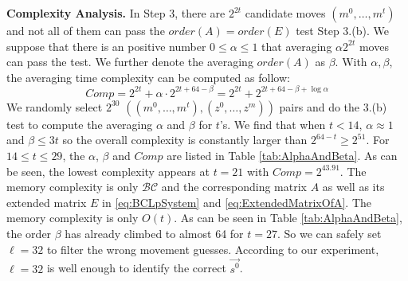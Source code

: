 \noindent\textbf{Complexity Analysis. }
In Step 3, there are $2^{2t}$ candidate moves $(m^0,\ldots, m^{t})$ and not all of them can pass the $order(A)=order(E)$ test Step 3.(b).
We suppose that there is an positive number $0\leq \alpha \leq 1$ that averaging $\alpha  2^{2t}$ moves can pass the test.
We further denote the averaging $order(A)$ as $\beta $.
With $\alpha ,\beta $, the averaging time complexity can be computed as follow:
\begin{equation}\label{eq:Complexity}
  Comp=2^{2t}+\alpha \cdot 2^{2t+64-\beta }=2^{2t}+2^{2t+64-\beta +\log\alpha }
\end{equation}
We randomly select $2^{30}$ $((m^0,\ldots, m^t), (z^0,\ldots, z^m))$ pairs and do the 3.(b) test to compute the averaging $\alpha$ and $\beta$ for $t$'s.
We find that when $t<14$, $\alpha \approx 1$ and $\beta\leq 3t$ so the overall complexity is constantly larger than $2^{64-t}\geq 2^{51}$.
For $14\leq t\leq 29$, the $\alpha$, $\beta$ and $Comp$ are listed in Table \ref{tab:AlphaAndBeta}.
As can be seen, the lowest complexity appears at $t=21$ with $Comp=2^{43.91}$.
The memory complexity is only $\mathcal{BC}$ and the corresponding matrix $A$ as well as its extended matrix $E$ in \eqref{eq:BCLpSystem} and \eqref{eq:ExtendedMatrixOfA}.
The memory complexity is only $O(t)$.
As can be seen in Table \ref{tab:AlphaAndBeta}, the order $\beta$ has already climbed to almost 64 for $t=27$.
So we can safely set $\ell=32$ to filter the wrong movement guesses.
According to our experiment, $\ell=32$ is well enough to identify the correct $\vec{s^0}$.



